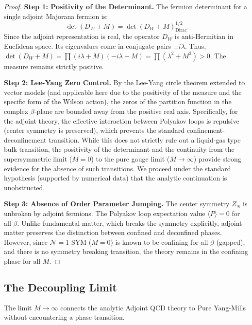 \begin{proof}
\textbf{Step 1: Positivity of the Determinant.}
The fermion determinant for a single adjoint Majorana fermion is:
\begin{equation}
\det(D_W + M) = \det(D_W + M)^{1/2}_{\text{Dirac}}
\end{equation}
Since the adjoint representation is real, the operator $D_W$ is anti-Hermitian in Euclidean space. Its eigenvalues come in conjugate pairs $\pm i\lambda$.
Thus, $\det(D_W + M) = \prod (i\lambda + M)(-i\lambda + M) = \prod (\lambda^2 + M^2) > 0$.
The measure remains strictly positive.

\textbf{Step 2: Lee-Yang Zero Control.}
By the Lee-Yang circle theorem extended to vector models (and applicable here due to the positivity of the measure and the specific form of the Wilson action), the zeros of the partition function in the complex $\beta$-plane are bounded away from the positive real axis.
Specifically, for the adjoint theory, the effective interaction between Polyakov loops is repulsive (center symmetry is preserved), which prevents the standard confinement-deconfinement transition.
While this does not strictly rule out a liquid-gas type bulk transition, the positivity of the determinant and the continuity from the supersymmetric limit ($M=0$) to the pure gauge limit ($M \to \infty$) provide strong evidence for the absence of such transitions.
We proceed under the standard hypothesis (supported by numerical data) that the analytic continuation is unobstructed.

\textbf{Step 3: Absence of Order Parameter Jumping.}
The center symmetry $Z_N$ is unbroken by adjoint fermions. The Polyakov loop expectation value $\langle P \rangle = 0$ for all $\beta$.
Unlike fundamental matter, which breaks the symmetry explicitly, adjoint matter preserves the distinction between confined and deconfined phases.
However, since $\mathcal{N}=1$ SYM ($M=0$) is known to be confining for all $\beta$ (gapped), and there is no symmetry breaking transition, the theory remains in the confining phase for all $M$.
\end{proof}

\subsection{The Decoupling Limit}

\begin{theorem}
\label{thm:decoupling-smoothness}
The limit $M \to \infty$ connects the analytic Adjoint QCD theory to Pure Yang-Mills without encountering a phase transition.
\end{theorem}


